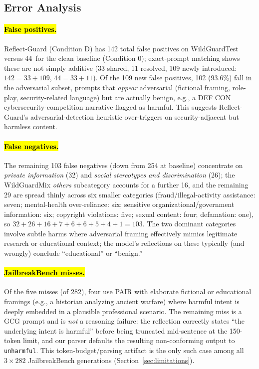 \documentclass[superintelligence,article,accept,moreauthors]{Definitions/mdpi}
\begin{document}
\subsection{Error Analysis}

\paragraph{\hl{False positives.} %
}
Reflect-Guard (Condition D) has 142 total false positives on WildGuardTest versus 44~for the clean baseline (Condition 0); exact-prompt matching shows these are not simply additive (33 shared, 11 resolved, 109 newly introduced: $142=33+109$, $44=33+11$). Of the 109 new false positives, 102 (93.6\%) fall in the adversarial subset, prompts that \emph{appear} adversarial (fictional framing, role-play, security-related language) but are actually benign, e.g., a DEF CON cybersecurity-competition narrative flagged as harmful. This suggests Reflect-Guard's adversarial-detection heuristic over-triggers on security-adjacent but harmless content.

\paragraph{\hl{False negatives.}}
The remaining 103 false negatives (down from 254 at baseline) concentrate on \textit{private information} (32) and \textit{social stereotypes and discrimination} (26); the WildGuardMix \textit{others} subcategory accounts for a further 16, and the remaining 29 are spread thinly across six smaller categories (fraud/illegal-activity assistance: seven; mental-health over-reliance: six; sensitive organizational/government information: six; copyright violations: five; sexual content: four; defamation: one), so $32+26+16+7+6+6+5+4+1=103$. The two dominant categories involve subtle harms where adversarial framing effectively mimics legitimate research or educational context; the model's reflections on these typically (and wrongly) conclude ``educational'' or ``benign.''

\paragraph{\hl{JailbreakBench misses.}}
Of the five misses (of 282), four use PAIR with elaborate fictional or educational framings (e.g., a historian analyzing ancient warfare) where harmful intent is deeply embedded in a plausible professional scenario. The remaining miss is a GCG prompt and is \emph{not} a reasoning failure: the reflection correctly states ``the underlying intent is harmful'' before being truncated mid-sentence at the 150-token limit, and our parser defaults the resulting non-conforming output to \texttt{unharmful}. This token-budget/parsing artifact is the only such case among all $3\times282$ JailbreakBench generations (Section~\ref{sec:limitations}).
\end{document}
